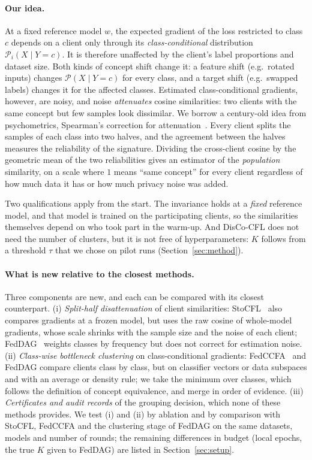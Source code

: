 \documentclass[11pt]{article}
\theoremstyle{definition}
\theoremstyle{remark}
\newcommand{\cP}{\mathcal{P}}
\begin{document}
\paragraph{Our idea.} At a fixed reference model $w$, the expected gradient of the loss restricted to class $c$ depends on a client only through its \emph{class-conditional} distribution $\cP_i(X\mid Y=c)$. It is therefore unaffected by the client's label proportions and dataset size. Both kinds of concept shift change it: a feature shift (e.g.\ rotated inputs) changes $\cP(X\mid Y=c)$ for every class, and a target shift (e.g.\ swapped labels) changes it for the affected classes. Estimated class-conditional gradients, however, are noisy, and noise \emph{attenuates} cosine similarities: two clients with the same concept but few samples look dissimilar. We borrow a century-old idea from psychometrics, Spearman's correction for attenuation~\citep{spearman1904,spearman1910,brown1910}. Every client splits the samples of each class into two halves, and the agreement between the halves measures the reliability of the signature. Dividing the cross-client cosine by the geometric mean of the two reliabilities gives an estimator of the \emph{population} similarity, on a scale where $1$ means ``same concept'' for every client regardless of how much data it has or how much privacy noise was added.

Two qualifications apply from the start. The invariance holds at a \emph{fixed} reference model, and that model is trained on the participating clients, so the similarities themselves depend on who took part in the warm-up. And DisCo-CFL does not need the number of clusters, but it is not free of hyperparameters: $K$ follows from a threshold $\tau$ that we chose on pilot runs (Section~\ref{sec:method}).

\paragraph{What is new relative to the closest methods.} Three components are new, and each can be compared with its closest counterpart. (i) \emph{Split-half disattenuation} of client similarities: StoCFL~\citep{zeng2025stocfl} also compares gradients at a frozen model, but uses the raw cosine of whole-model gradients, whose scale shrinks with the sample size and the noise of each client; FedDAG~\citep{pramanik2026feddag} weights classes by frequency but does not correct for estimation noise. (ii) \emph{Class-wise bottleneck clustering} on class-conditional gradients: FedCCFA~\citep{chen2024fedccfa} and FedDAG compare clients class by class, but on classifier vectors or data subspaces and with an average or density rule; we take the minimum over classes, which follows the definition of concept equivalence, and merge in order of evidence. (iii) \emph{Certificates and audit records} of the grouping decision, which none of these methods provides. We test (i) and (ii) by ablation and by comparison with StoCFL, FedCCFA and the clustering stage of FedDAG on the same datasets, models and number of rounds; the remaining differences in budget (local epochs, the true $K$ given to FedDAG) are listed in Section~\ref{sec:setup}.
\end{document}
